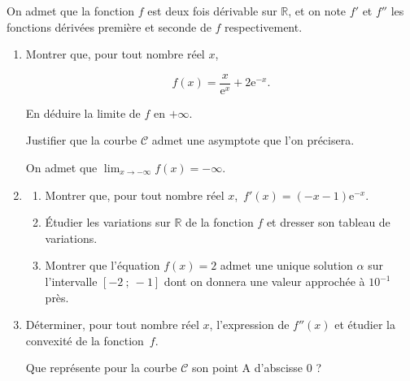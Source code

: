 \documentclass[10pt]{article}
\providecommand{\R}{\mathbb{R}}
\providecommand{\e}{{\mathrm{e}}}
\begin{document}
On admet que la fonction $f$ est deux fois dérivable sur $\R$, et on note $f'$ et $f''$ les fonctions dérivées première et seconde de $f$ respectivement.

\medskip

\begin{enumerate}
\item Montrer que, pour tout nombre réel $x$,

\[f(x) = \dfrac{x}{\e^{x}}+ 2\e^{-x}.\]

En déduire la limite de $f$ en $+ \infty$.

Justifier que la courbe $\mathcal{C}$ admet une asymptote que l'on précisera.

On admet que $\displaystyle\lim_{x \to - \infty} f(x) = - \infty$.
\item 
	\begin{enumerate}
		\item Montrer que, pour tout nombre réel $x$,\, $f'(x) = (- x - 1)\e^{-x}$.
		\item Étudier les variations sur $\R$ de la fonction $f$ et dresser son tableau de variations.
		\item Montrer que l'équation $f(x) = 2$ admet une unique solution $\alpha$ sur l'intervalle $[-2~;~-1]$ dont on donnera une valeur approchée à $10^{-1}$ près.
	\end{enumerate}
\item Déterminer, pour tout nombre réel $x$, l'expression de $f''(x)$ et étudier la convexité de la fonction~$f$. 

Que représente pour la courbe $\mathcal{C}$ son point A d'abscisse $0$ ?
\end{enumerate}
\end{document}
